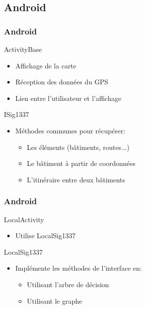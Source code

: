 \documentclass{beamer}
\begin{document}
\subsection{Android}
\begin{frame}
\frametitle{Android}
\begin{block}{ActivityBase}
\begin{itemize}
\item Affichage de la carte
\item Réception des données du GPS
\item Lien entre l'utilisateur et l'affichage
\end{itemize}
\end{block}
\begin{block}{ISig1337}
\begin{itemize}
\item Méthodes communes pour récupérer:\begin{itemize}
\item Les éléments (bâtiments, routes...)
\item Le bâtiment à partir de coordonnées
\item L'itinéraire entre deux bâtiments
\end{itemize}
\end{itemize}
\end{block}
\end{frame}

\begin{frame}
\frametitle{Android}
\begin{block}{LocalActivity}
\begin{itemize}
\item Utilise LocalSig1337
\end{itemize}
\end{block}
\begin{block}{LocalSig1337}
\begin{itemize}
\item Implémente les méthodes de l'interface en:\begin{itemize}
\item Utilisant l'arbre de décision
\item Utilisant le graphe
\end{itemize}
\end{itemize}
\end{block}
\end{frame}
\end{document}
